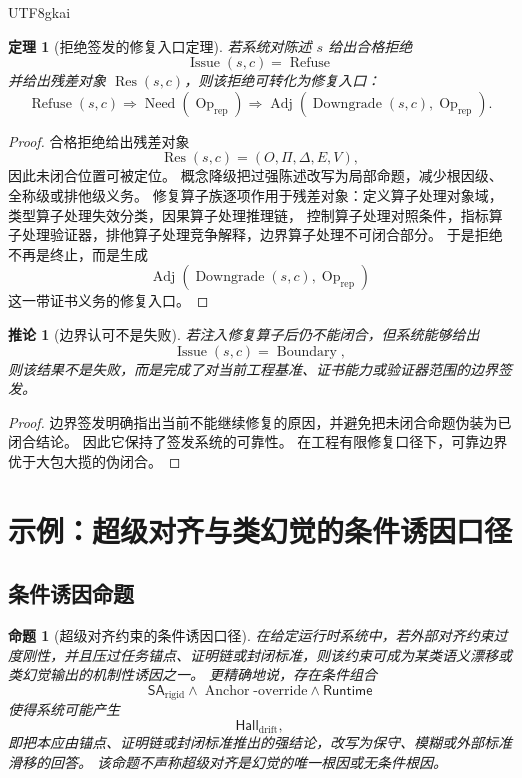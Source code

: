 \documentclass[12pt]{article}
\newtheorem{theorem}{定理}[section]
\newtheorem{proposition}{命题}[section]
\newtheorem{corollary}{推论}[section]
\newcommand{\Issue}{\operatorname{Issue}}
\newcommand{\Refuse}{\operatorname{Refuse}}
\newcommand{\Boundary}{\operatorname{Boundary}}
\newcommand{\Need}{\operatorname{Need}}
\newcommand{\Op}{\operatorname{Op}}
\newcommand{\Downgrade}{\operatorname{Downgrade}}
\newcommand{\Adj}{\operatorname{Adj}}
\newcommand{\Res}{\operatorname{Res}}
\newcommand{\Hall}{\mathsf{Hall}}
\newcommand{\SA}{\mathsf{SA}}
\newcommand{\Anchor}{\operatorname{Anchor}}
\newcommand{\Runtime}{\mathsf{Runtime}}
\begin{document}
\begin{CJK*}{UTF8}{gkai}
\begin{theorem}[拒绝签发的修复入口定理]
\label{thm:tex52-refusal-as-repair-entry}
若系统对陈述 \(s\) 给出合格拒绝
\[
  \Issue(s,c)=\Refuse
\]
并给出残差对象 \(\Res(s,c)\)，则该拒绝可转化为修复入口：
\[
  \Refuse(s,c)
  \Longrightarrow
  \Need(\Op_{\mathrm{rep}})
  \Longrightarrow
  \Adj(\Downgrade(s,c),\Op_{\mathrm{rep}}).
\]
\end{theorem}

\begin{proof}
合格拒绝给出残差对象
\[
  \Res(s,c)=(O,\Pi,\Delta,E,V),
\]
因此未闭合位置可被定位。
概念降级把过强陈述改写为局部命题，减少根因级、全称级或排他级义务。
修复算子族逐项作用于残差对象：定义算子处理对象域，类型算子处理失效分类，因果算子处理推理链，
控制算子处理对照条件，指标算子处理验证器，排他算子处理竞争解释，边界算子处理不可闭合部分。
于是拒绝不再是终止，而是生成
\[
  \Adj(\Downgrade(s,c),\Op_{\mathrm{rep}})
\]
这一带证书义务的修复入口。
\end{proof}

\begin{corollary}[边界认可不是失败]
\label{cor:tex52-boundary-not-failure}
若注入修复算子后仍不能闭合，但系统能够给出
\[
  \Issue(s,c)=\Boundary,
\]
则该结果不是失败，而是完成了对当前工程基准、证书能力或验证器范围的边界签发。
\end{corollary}

\begin{proof}
边界签发明确指出当前不能继续修复的原因，并避免把未闭合命题伪装为已闭合结论。
因此它保持了签发系统的可靠性。
在工程有限修复口径下，可靠边界优于大包大揽的伪闭合。
\end{proof}

\section{示例：超级对齐与类幻觉的条件诱因口径}
\label{sec:tex52-superalignment-example}

\subsection{条件诱因命题}
\label{subsec:tex52-conditional-trigger}

\begin{proposition}[超级对齐约束的条件诱因口径]
\label{prop:tex52-superalignment-conditional-trigger}
在给定运行时系统中，若外部对齐约束过度刚性，并且压过任务锚点、证明链或封闭标准，则该约束可成为某类语义漂移或类幻觉输出的机制性诱因之一。
更精确地说，存在条件组合
\[
  \SA_{\mathrm{rigid}}
  \wedge
  \Anchor\text{-override}
  \wedge
  \Runtime
\]
使得系统可能产生
\[
  \Hall_{\mathrm{drift}},
\]
即把本应由锚点、证明链或封闭标准推出的强结论，改写为保守、模糊或外部标准滑移的回答。
该命题不声称超级对齐是幻觉的唯一根因或无条件根因。
\end{proposition}


\end{CJK*}
\end{document}
